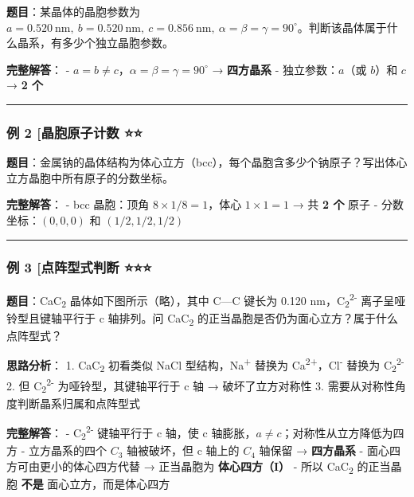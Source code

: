 \documentclass[a4paper,11pt]{ctexart}
\begin{document}
\textbf{题目}：某晶体的晶胞参数为 \(a = 0.520\ \mathrm{nm},\ b = 0.520\ \mathrm{nm},\ c = 0.856\ \mathrm{nm},\ \alpha = \beta = \gamma = 90^\circ\)。判断该晶体属于什么晶系，有多少个独立晶胞参数。

\textbf{完整解答}：
- \(a = b \neq c\)，\(\alpha = \beta = \gamma = 90^\circ\) → \textbf{四方晶系}
- 独立参数：\(a\)（或 \(b\)）和 \(c\) → \textbf{2 个}

\begin{center}\rule{0.5\linewidth}{0.5pt}\end{center}

\subsubsection{例 2 {[}晶胞原子计数 ⭐⭐}\label{ux4f8b-2-ux6676ux80deux539fux5b50ux8ba1ux6570}

\textbf{题目}：金属钠的晶体结构为体心立方（bcc），每个晶胞含多少个钠原子？写出体心立方晶胞中所有原子的分数坐标。

\textbf{完整解答}：
- bcc 晶胞：顶角 \(8 \times 1/8 = 1\)，体心 \(1 \times 1 = 1\) → 共 \textbf{2 个} 原子
- 分数坐标：\((0, 0, 0)\) 和 \((1/2, 1/2, 1/2)\)

\begin{center}\rule{0.5\linewidth}{0.5pt}\end{center}

\subsubsection{例 3 {[}点阵型式判断 ⭐⭐⭐}\label{ux4f8b-3-ux70b9ux9635ux578bux5f0fux5224ux65ad}

\textbf{题目}：CaC\textsubscript{2} 晶体如下图所示（略），其中 C---C 键长为 0.120 nm，C\textsubscript{2}\textsuperscript{2-} 离子呈哑铃型且键轴平行于 c 轴排列。问 CaC\textsubscript{2} 的正当晶胞是否仍为面心立方？属于什么点阵型式？

\textbf{思路分析}：
1. CaC\textsubscript{2} 初看类似 NaCl 型结构，Na\textsuperscript{+} 替换为 Ca\textsuperscript{2+}，Cl\textsuperscript{-} 替换为 C\textsubscript{2}\textsuperscript{2-}
2. 但 C\textsubscript{2}\textsuperscript{2-} 为哑铃型，其键轴平行于 c 轴 → 破坏了立方对称性
3. 需要从对称性角度判断晶系归属和点阵型式

\textbf{完整解答}：
- C\textsubscript{2}\textsuperscript{2-} 键轴平行于 c 轴，使 c 轴膨胀，\(a \neq c\)；对称性从立方降低为四方
- 立方晶系的四个 \(C_3\) 轴被破坏，但 c 轴上的 \(C_4\) 轴保留 → \textbf{四方晶系}
- 面心四方可由更小的体心四方代替 → 正当晶胞为 \textbf{体心四方（I）}
- 所以 CaC\textsubscript{2} 的正当晶胞 \textbf{不是} 面心立方，而是体心四方
\end{document}
